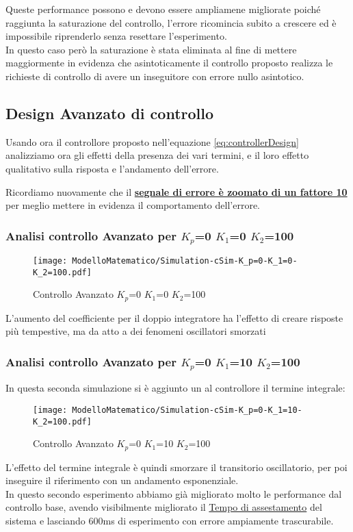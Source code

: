 \noindent
Queste performance possono e devono essere ampliamene migliorate poiché raggiunta la saturazione del controllo, l'errore ricomincia subito a crescere ed è impossibile riprenderlo senza resettare l'esperimento.\\
In questo caso però la saturazione è stata eliminata al fine di mettere maggiormente in evidenza che asintoticamente il controllo proposto realizza le richieste di controllo di avere un inseguitore con errore nullo asintotico.

\newpage
\subsection{Design Avanzato di controllo}
Usando ora il controllore proposto nell'equazione \ref{eq:controllerDesign} analizziamo ora gli effetti della presenza dei vari termini, e il loro effetto qualitativo sulla risposta e l'andamento dell'errore.
\begin{mdframed}[backgroundcolor=fawn]
Ricordiamo nuovamente che il {\color{cadmiumgreen}\textbf{\underline{segnale di errore è zoomato di un fattore 10}}} per meglio mettere in evidenza il comportamento dell'errore.
\end{mdframed}

\subsubsection{Analisi controllo Avanzato per $ K_p $=0 $ K_1 $=0 $ K_2 $=100}
\begin{figure}[H]
	\centering
	\caption[Controllo Avanzato $ K_p $=0 $ K_1 $=0 $ K_2 $=100] {Controllo Avanzato $ K_p $=0 $ K_1 $=0 $ K_2 $=100}
	\texttt{[image: ModelloMatematico/Simulation-cSim-K\_p=0-K\_1=0-K\_2=100.pdf]}
\end{figure}
\noindent
L'aumento del coefficiente per il doppio integratore ha l'effetto di creare risposte più tempestive, ma da atto a dei fenomeni oscillatori smorzati

\subsubsection{Analisi controllo Avanzato per $ K_p $=0 $ K_1 $=10 $ K_2 $=100}
In questa seconda simulazione si è aggiunto un al controllore il termine integrale:
\begin{figure}[H]
	\centering
	\caption[Controllo Avanzato $ K_p $=0 $ K_1 $=10 $ K_2 $=100]{Controllo Avanzato $ K_p $=0 $ K_1 $=10 $ K_2 $=100}
	\texttt{[image: ModelloMatematico/Simulation-cSim-K\_p=0-K\_1=10-K\_2=100.pdf]}
\end{figure}
\noindent
L'effetto del termine integrale è quindi smorzare il transitorio oscillatorio, per poi inseguire il riferimento con un andamento esponenziale.\\
In questo secondo esperimento abbiamo già migliorato molto le performance dal controllo base, avendo visibilmente migliorato il \underline{Tempo di assestamento} del sistema e lasciando 600ms di esperimento con errore ampiamente trascurabile.
\newpage
